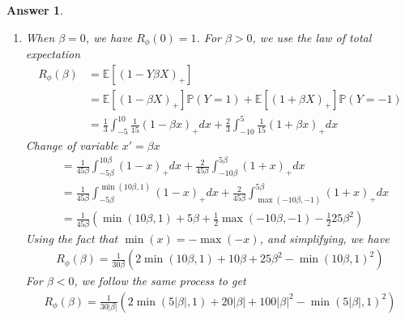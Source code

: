 \documentclass[12pt]{article}
\theoremstyle{colon}
\newtheorem*{answer}{Answer}
\begin{document}
\begin{answer}
\begin{enumerate}[label=\alph*)]
    \item When $\beta = 0$, we have $R_\phi(0) = 1$. For $\beta > 0$, we use the law of total expectation
      \begin{align*}
        R_\phi(\beta) &= \mathbb{E}[(1-Y \beta X)_+] \\
        &= \mathbb{E}[(1-\beta X)_+] \mathbb{P}(Y=1) + \mathbb{E}[(1+\beta X)_+] \mathbb{P}(Y=-1) \\
        &= \frac{1}{3} \int_{-5}^10 \frac{1}{15} (1 - \beta x)_+ dx + \frac{2}{3} \int_{-10}^5 \frac{1}{15} (1 + \beta x)_+ dx
      \end{align*}
      Change of variable $x' = \beta x$
      \begin{align*}
        &= \frac{1}{45 \beta} \int_{-5 \beta}^{10 \beta} (1 - x)_+ dx + \frac{2}{45 \beta} \int_{-10 \beta}^{5 \beta} (1 + x)_+ dx \\
        &= \frac{1}{45 \beta} \int_{-5 \beta}^{\min(10 \beta, 1)} (1 - x)_+ dx + \frac{2}{45 \beta} \int_{\max(-10 \beta,-1)}^{5 \beta} (1 + x)_+ dx \\
        &= \frac{1}{45 \beta} ( \min(10 \beta, 1) + 5 \beta + \frac{1}{2} \max(-10\beta, -1) - \frac{1}{2} 25 \beta^2)
      \end{align*}
      Using the fact that $\min(x) = - \max(-x)$, and simplifying, we have
      \begin{gather*}
        R_\phi(\beta) = \frac{1}{30 \beta} (2 \min(10 \beta, 1) + 10 \beta + 25 \beta^2 - \min(10 \beta, 1)^2)
      \end{gather*}
      For $\beta < 0$, we follow the same process to get
      \begin{gather*}
        R_\phi(\beta) = \frac{1}{30 \lvert \beta \rvert} (2 \min(5 \lvert \beta \rvert, 1) + 20 \lvert \beta \rvert + 100 \lvert \beta \rvert^2 - \min(5 \lvert \beta \rvert, 1)^2)
      \end{gather*}
  \end{enumerate}
\end{answer}

\clearpage
\end{document}
